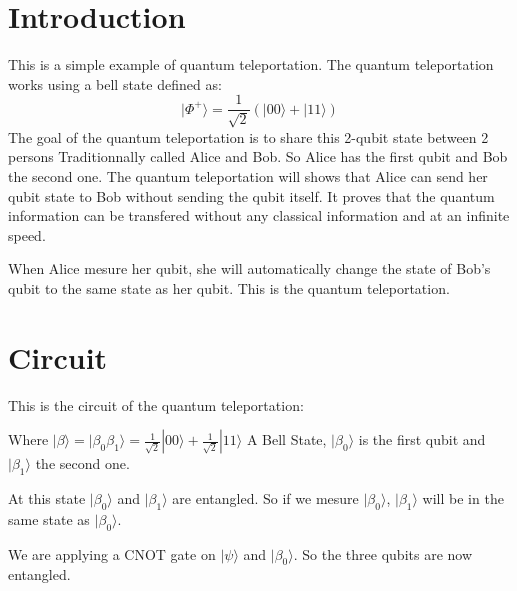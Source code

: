 \documentclass{article}
\begin{document}
\section{Introduction}
This is a simple example of quantum teleportation.
The quantum teleportation works using a bell state defined as:
\begin{equation}
    |\Phi^+\rangle = \frac{1}{\sqrt{2}}(|00\rangle + |11\rangle)
\end{equation}
The goal of the quantum teleportation is to share this 2-qubit state between 2 persons
Traditionnally called Alice and Bob. So Alice has the first qubit and Bob the second one.
The quantum teleportation will shows that Alice can send her qubit state to Bob without
sending the qubit itself. It proves that the quantum information can be transfered without
any classical information and at an infinite speed.

When Alice mesure her qubit, she will automatically change the state of Bob's qubit
to the same state as her qubit. This is the quantum teleportation.

\section{Circuit}
This is the circuit of the quantum teleportation:


Where $|\beta\rangle = |\beta_0\beta_1\rangle = \frac{1}{\sqrt{2}}|00\rangle + \frac{1}{\sqrt{2}}|11\rangle$
A Bell State, $|\beta_0\rangle$ is the first qubit and $|\beta_1\rangle$ the second one.

At this state $|\beta_0\rangle$ and $|\beta_1\rangle$ are entangled. So if we mesure $|\beta_0\rangle$,
$|\beta_1\rangle$ will be in the same state as $|\beta_0\rangle$.

We are applying a CNOT gate on $|\psi\rangle$ and $|\beta_0\rangle$. So the three qubits are now entangled.
\end{document}
